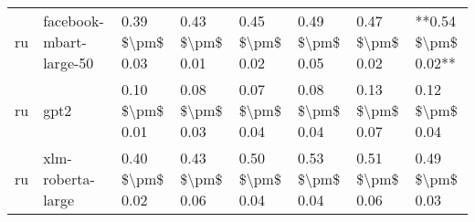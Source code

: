 \begin{tabular}{llllllll}
      ru &            facebook-mbart-large-50 & 0.39 \$\textbackslash pm\$ 0.03 &           0.43 \$\textbackslash pm\$ 0.01 &       0.45 \$\textbackslash pm\$ 0.02 &        0.49 \$\textbackslash pm\$ 0.05 &                         0.47 \$\textbackslash pm\$ 0.02 & **0.54 \$\textbackslash pm\$ 0.02** \\
      ru &                               gpt2 & 0.10 \$\textbackslash pm\$ 0.01 &           0.08 \$\textbackslash pm\$ 0.03 &       0.07 \$\textbackslash pm\$ 0.04 &        0.08 \$\textbackslash pm\$ 0.04 &                         0.13 \$\textbackslash pm\$ 0.07 &     0.12 \$\textbackslash pm\$ 0.04 \\
      ru &                  xlm-roberta-large & 0.40 \$\textbackslash pm\$ 0.02 &           0.43 \$\textbackslash pm\$ 0.06 &       0.50 \$\textbackslash pm\$ 0.04 &        0.53 \$\textbackslash pm\$ 0.04 &                         0.51 \$\textbackslash pm\$ 0.06 &     0.49 \$\textbackslash pm\$ 0.03 \\
\bottomrule
\end{tabular}
